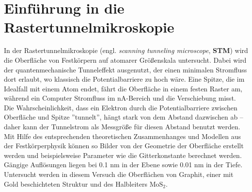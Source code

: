 \section{Einführung in die Rastertunnelmikroskopie}
In der Rastertunnelmikroskopie (engl. \textit{scanning tunneling
microscope}, \textbf{STM}) wird die Oberfläche von Festkörpern auf atomarer 
Größenskala untersucht. Dabei wird der quantenmechanische Tunneleffekt 
ausgenutzt, der einen minimalen Stromfluss dort erlaubt, wo klassisch 
die Potentialbarriere zu hoch wäre. Eine Spitze, die im Idealfall mit 
einem Atom endet, fährt die Oberfläche in einem festen Raster am, während 
ein Computer Stromfluss im nA-Bereich und die Verschiebung misst. 
Die Wahrscheinlichkeit, dass ein Elektron durch die Potentialbarriere 
zwischen Oberfläche und Spitze ”tunnelt”, hängt stark von dem Abstand 
dazwischen ab – daher kann der Tunnelstrom als Messgröße für diesen 
Abstand benutzt werden. Mit Hilfe des entsprechenden theoretischen 
Zusammenhanges und Modellen aus der Festkörperphysik können so Bilder 
von der Geometrie der Oberfläche erstellt werden und beispielsweise 
Parameter wie die Gitterkonstante berechnet werden. Gängige Auflösungen liegen
bei 0.1 nm in der Ebene sowie 0.01 nm in der Tiefe. Untersucht werden in 
diesem Versuch die Oberflächen von Graphit, einer mit Gold beschichteten 
Struktur und des Halbleiters $\mathrm{MoS_2}$. 

